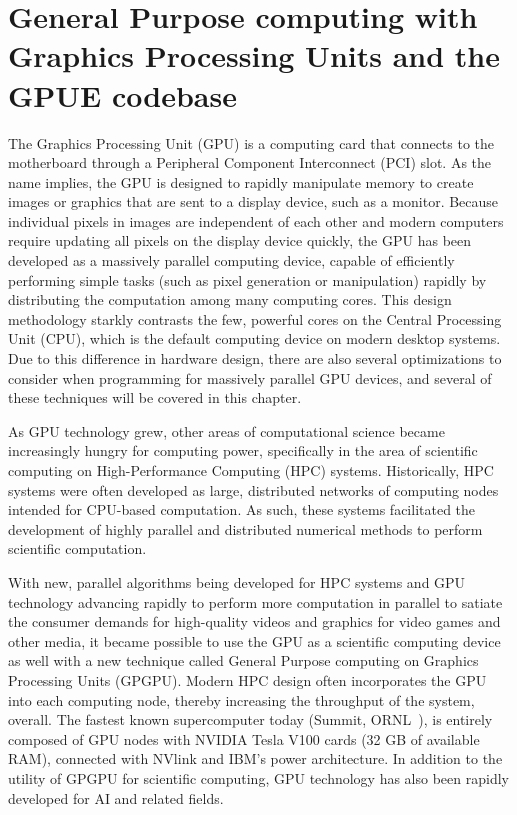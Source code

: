 \chapter{General Purpose computing with Graphics Processing Units and the GPUE codebase}
\label{ch:gpu}

The Graphics Processing Unit (GPU) is a computing card that connects to the motherboard through a Peripheral Component Interconnect (PCI) slot.
As the name implies, the GPU is designed to rapidly manipulate memory to create images or graphics that are sent to a display device, such as a monitor.
Because individual pixels in images are independent of each other and modern computers require updating all pixels on the display device quickly, the GPU has been developed as a massively parallel computing device, capable of efficiently performing simple tasks (such as pixel generation or manipulation) rapidly by distributing the computation among many computing cores.
This design methodology starkly contrasts the few, powerful cores on the Central Processing Unit (CPU), which is the default computing device on modern desktop systems.
Due to this difference in hardware design, there are also several optimizations to consider when programming for massively parallel GPU devices, and several of these techniques will be covered in this chapter.

As GPU technology grew, other areas of computational science became increasingly hungry for computing power, specifically in the area of scientific computing on High-Performance Computing (HPC) systems.
Historically, HPC systems were often developed as large, distributed networks of computing nodes intended for CPU-based computation.
As such, these systems facilitated the development of highly parallel and distributed numerical methods to perform scientific computation.

With new, parallel algorithms being developed for HPC systems and GPU technology advancing rapidly to perform more computation in parallel to satiate the consumer demands for high-quality videos and graphics for video games and other media, it became possible to use the GPU as a scientific computing device as well with a new technique called General Purpose computing on Graphics Processing Units (GPGPU).
Modern HPC design often incorporates the GPU into each computing node, thereby increasing the throughput of the system, overall.
The fastest known supercomputer today (Summit, ORNL~\cite{kahle2019}), is entirely composed of GPU nodes with NVIDIA Tesla V100 cards (32 GB of available RAM), connected with NVlink and IBM's power architecture.
In addition to the utility of GPGPU for scientific computing, GPU technology has also been rapidly developed for AI and related fields.

